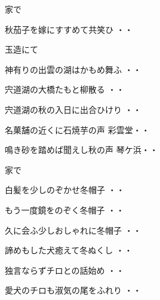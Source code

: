 家で
\begin{shiika}秋茄子を嫁にすすめて共笑ひ
\hfill{・・}\end{shiika}
\vspace{0.6cm}
玉造にて
\begin{shiika}神有りの出雲の湖はかもめ舞ふ
\hfill{・・}\end{shiika}
\begin{shiika}宍道湖の大橋たもと柳散る
\hfill{・・}\end{shiika}
\begin{shiika}宍道湖の秋の入日に出合ひけり
\hfill{・・}\end{shiika}
\begin{shiika}名菓舗の近くに石焼芋の声
彩雲堂\hfill{・・}\end{shiika}
\begin{shiika}鳴き砂を踏めば聞えし秋の声
琴ケ浜\hfill{・・}\end{shiika}
\vspace{0.6cm}
家で
\begin{shiika}白髪を少しのぞかせ冬帽子
\hfill{・・}\end{shiika}
\vspace{0.6cm}
\begin{shiika}もう一度鏡をのぞく冬帽子
\hfill{・・}\end{shiika}
\vspace{0.6cm}
\begin{shiika}久に会ふ少しおしゃれに冬帽子
\hfill{・・}\end{shiika}
\vspace{0.6cm}
\begin{shiika}諦めもした犬癒えて冬ぬくし
\hfill{・・}\end{shiika}
\vspace{0.6cm}
\begin{shiika}独言ならずチロとの話始め
\hfill{・・}\end{shiika}
\vspace{0.6cm}
\begin{shiika}愛犬のチロも淑気の尾をふれり
\hfill{・・}\end{shiika}
